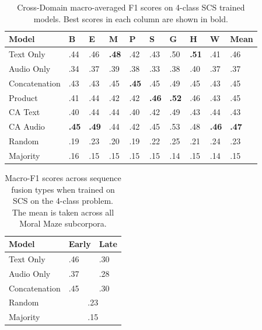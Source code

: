 \documentclass[twocolumn]{article}
\begin{document}
\begin{table}[t]
\centering
\caption{Cross-Domain macro-averaged F1 scores on 4-class SCS trained models. Best scores in each column are shown in bold. \label{tbl:cross-4-SCS}}
\begin{tabular}{|l|llllllll|l|}
\hline
Model         & B            & E            & M            & P            & S            & G            & H            & W            & Mean \\ \hline
Text Only     & .44          & .46          & \textbf{.48} & .42          & .43          & .50          & \textbf{.51} & .41          & .46  \\
Audio Only    & .34          & .37          & .39          & .38          & .33          & .38          & .40          & .37          & .37 \\ \hline
Concatenation & .43          & .43          & .45          & \textbf{.45} & .45          & .49          & .45          & .43          & .45  \\
Product       & .41          & .44          & .42          & .42          & \textbf{.46} & \textbf{.52} & .46          & .43          & .45 \\
CA Text       & .40          & .44          & .44          & .40          & .42          & .49          & .43          & .44          & .43  \\
CA Audio      & \textbf{.45} & \textbf{.49} & .44          & .42          & .45          & .53          & .48          & \textbf{.46} & \textbf{.47}  \\ \hline
Random        & .19          & .23          & .20          & .19          & .22          & .25          & .21          & .24          & .23 \\
Majority      & .16          & .15          & .15          & .15          & .15          & .14          & .15          & .14          & .15  \\ \hline
\end{tabular}
\end{table}

\begin{table}[h]
\centering
\caption{Macro-F1 scores across sequence fusion types when trained on SCS on the 4-class problem. The mean is taken across all Moral Maze subcorpora. \label{tbl:cross-4-seq}}
\begin{tabular}{|l|ll|}
\hline
Model         & Early       & Late      \\ \hline
Text Only     & .46         & .30       \\
Audio Only    & .37         & .28       \\
Concatenation & .45         & .30       \\ \hline
Random        & \multicolumn{2}{c|}{.23} \\
Majority      & \multicolumn{2}{c|}{.15} \\ \hline
\end{tabular}
\end{table}
\end{document}
